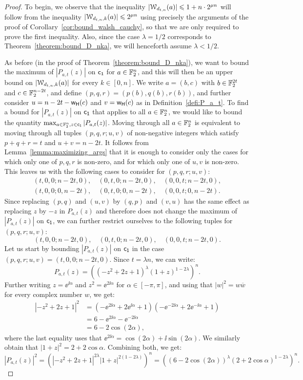 \documentclass[11pt]{llncs}
\begin{document}
\begin{proof}
    To begin, we observe that the inequality $|\mathcal W_{d_{t,n}}(a)|\leqslant 1+n\cdot 2^{\mu n}$ will follow from the inequality $|\mathcal{W}_{d_{t,n},k}(a)|\leqslant 2^{\mu n}$ using precisely the arguments of the proof of Corollary~\ref{cor:bound_walsh_cauchy}, so that we are only required to prove the first inequality. Also, since the case $\lambda=1/2$ corresponds to Theorem~\ref{theorem:bound_D_nka}, we will henceforth assume $\lambda<1/2$.
    
    As before (in the proof of Theorem~\ref{theorem:bound_D_nka}), we want to bound the maximum of $|P_{a,t}(z)|$ on $\mathsf{c_1}$ for $a\in\mathbb{F}_2^n$, and this will then be an upper bound on $|\mathcal{W}_{d_{t,n},k}(a)|$ for every $k\in[0,n]$. 
    We write $a=(b,c)$ with $b\in\mathbb{F}_2^{2t}$ and $c\in\mathbb{F}_2^{n-2t}$, and define $(p,q,r)=(p(b),q(b),r(b))$, and further consider $u=n-2t-\mathsf{w_H}(c)$ and $v=\mathsf{w_H}(c)$ as in Definition~\ref{defi:P_a_t}.    
   To find a bound for $|P_{a,t}(z)|$ on $\mathsf{c_1}$ that applies to all $a\in\mathbb{F}_2^n$, we would like to bound the quantity $\max_{a\in\mathbb{F}_2^n,z\in\mathsf{c_1}}|P_{a,t}(z)|$. Moving through all $a\in\mathbb{F}_2^n$ is equivalent to moving through all tuples $(p,q,r;u,v)$ of non-negative integers which satisfy $p+q+r=t$ and $u+v=n-2t$. It follows from Lemma~\ref{lemma:maximizing_args} that it is enough to consider only the cases for which only one of $p,q,r$ is non-zero, and for which only one of $u,v$ is non-zero. 
   This leaves us with the following cases to consider for $(p,q,r;u,v)$:
    \begin{gather*}
        (t,0,0;n-2t,0),\quad(0,t,0;n-2t,0),\quad(0,0,t;n-2t,0),\\
         (t,0,0;0,n-2t),\quad(0,t,0;0,n-2t),\quad(0,0,t;0,n-2t).
    \end{gather*}
    Since replacing $(p,q)$ and $(u,v)$ by $(q,p)$ and $(v,u)$ has the same effect as replacing $z$ by $-z$ in $P_{a,t}(z)$ and therefore does not change the maximum of $|P_{a,t}(z)|$ on $\mathsf{c_1}$, we can further restrict ourselves to the following tuples for $(p,q,r;u,v)$:
    \[
        (t,0,0;n-2t,0),\quad(0,t,0;n-2t,0),\quad(0,0,t;n-2t,0).
    \]
    Let us start by bounding $|P_{a,t}(z)|$ on $\mathsf{c_1}$ in the case $(p,q,r;u,v)=(t,0,0;n-2t,0)$. Since $t=\lambda n$, we can write:
    \[
        P_{a,t}(z)=\left((-z^2+2z+1)^{\lambda}(1+z)^{1-2\lambda}\right)^n.
    \]
    Further writing $z=\ee^{\ii\alpha}$ and $z^2=\ee^{2\ii\alpha}$ for $\alpha\in[-\pi,\pi]$, and using that $|w|^2=w\overline w$ for every complex number $w$, we get:
    \begin{align*}
        |-z^2+2z+1|^2&=\left(-\ee^{2\ii\alpha}+2\ee^{\ii\alpha}+1\right)\left(-\ee^{-2\ii\alpha}+2\ee^{-\ii\alpha}+1\right)\\
        &=6-\ee^{2\ii\alpha}-\ee^{-2\ii\alpha}\\
        &=6-2\cos (2\alpha),
    \end{align*}
    where the last equality uses that $\ee^{2\ii\alpha}=\cos(2\alpha)+\ii\sin(2\alpha)$. We similarly obtain that $|1+z|^2=2+2\cos\alpha$. Combining both, we get:   
    \[
        |P_{a,t}(z)|^2=\left(\left|-z^2+2z+1\right|^{2\lambda}|1+z|^{2(1-2\lambda)}\right)^n=\left((6-2\cos(2\alpha))^\lambda(2+2\cos\alpha)^{1-2\lambda}\right)^n.
    \]
    

\end{proof}
\end{document}
